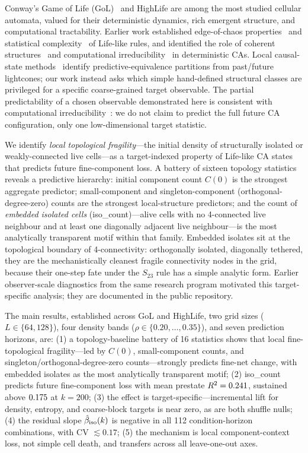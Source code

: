 \documentclass[aip,cha,preprint,nofootinbib]{revtex4-2}
\newcommand{\iso}{{\rm iso}}
\newcommand{\biso}{\hat{\beta}_{\iso}}
\begin{document}
Conway's Game of Life (GoL)~\cite{gardner1970} and HighLife are among
the most studied cellular automata, valued for their deterministic dynamics,
rich emergent structure, and computational tractability.
Earlier work established edge-of-chaos
properties~\cite{langton1990,wolfram1984} and statistical
complexity~\cite{crutchfield1989} of Life-like rules, and identified
the role of coherent structures~\cite{rupe2018} and computational
irreducibility~\cite{israeli2004} in deterministic CAs.
Local causal-state methods~\cite{crutchfield1989,rupe2018} identify
predictive-equivalence partitions from past/future lightcones; our work
instead asks which simple hand-defined structural classes are privileged for
a specific coarse-grained target observable.
The partial predictability of a chosen observable demonstrated here is
consistent with computational irreducibility~\cite{israeli2004}:
we do not claim to predict the full future CA configuration, only one
low-dimensional target statistic.

We identify \emph{local topological fragility}---the initial density of
structurally isolated or weakly-connected live cells---as a target-indexed
property of Life-like CA states that predicts future fine-component loss.
A battery of sixteen topology statistics reveals a predictive hierarchy:
initial component count $C(0)$ is the strongest aggregate predictor;
small-component and singleton-component (orthogonal-degree-zero) counts
are the strongest local-structure predictors; and the count of
\emph{embedded isolated cells} (iso\_count)---alive cells with no
4-connected live neighbour and at least one diagonally adjacent live
neighbour---is the most analytically transparent motif within that family.
Embedded isolates sit at the topological boundary of 4-connectivity:
orthogonally isolated, diagonally tethered, they are the mechanistically
cleanest fragile connectivity nodes in the grid, because their one-step
fate under the $S_{23}$ rule has a simple analytic form.
Earlier observer-scale diagnostics from the same research program motivated
this target-specific analysis; they are documented in the public repository.

The main results, established across GoL and HighLife, two grid sizes
($L\in\{64,128\}$), four density bands ($\rho\in\{0.20,\ldots,0.35\}$),
and seven prediction horizons, are:
(1) a topology-baseline battery of 16 statistics shows that local
fine-topological fragility---led by $C(0)$, small-component counts,
and singleton/orthogonal-degree-zero counts---strongly predicts fine-net
change, with embedded isolates as the most analytically transparent motif;
(2) iso\_count predicts future fine-component loss with mean prestate
$R^2 = 0.241$, sustained above $0.175$ at $k=200$;
(3) the effect is target-specific---incremental lift for density, entropy,
and coarse-block targets is near zero, as are both shuffle nulls;
(4) the residual slope $\biso(k)$ is negative in all 112 condition-horizon
combinations, with CV $\lesssim 0.17$;
(5) the mechanism is local component-context loss, not simple cell death,
and transfers across all leave-one-out axes.
\end{document}
